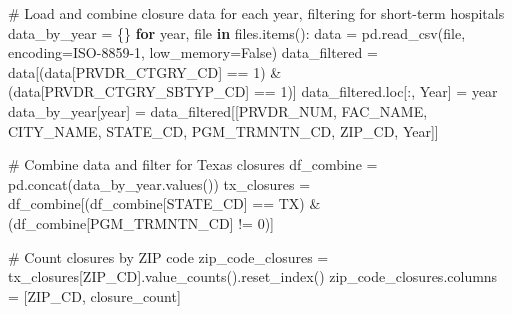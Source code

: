 \documentclass[
  letterpaper,
  DIV=11,
  numbers=noendperiod]{scrartcl}
\newenvironment{Shaded}{\begin{snugshade}}{\end{snugshade}}
\newcommand{\BuiltInTok}[1]{\textcolor[rgb]{0.00,0.23,0.31}{#1}}
\newcommand{\CommentTok}[1]{\textcolor[rgb]{0.37,0.37,0.37}{#1}}
\newcommand{\ControlFlowTok}[1]{\textcolor[rgb]{0.00,0.23,0.31}{\textbf{#1}}}
\newcommand{\DecValTok}[1]{\textcolor[rgb]{0.68,0.00,0.00}{#1}}
\newcommand{\KeywordTok}[1]{\textcolor[rgb]{0.00,0.23,0.31}{\textbf{#1}}}
\newcommand{\NormalTok}[1]{\textcolor[rgb]{0.00,0.23,0.31}{#1}}
\newcommand{\OperatorTok}[1]{\textcolor[rgb]{0.37,0.37,0.37}{#1}}
\newcommand{\StringTok}[1]{\textcolor[rgb]{0.13,0.47,0.30}{#1}}
\newcommand{\VariableTok}[1]{\textcolor[rgb]{0.07,0.07,0.07}{#1}}
\begin{document}
\begin{Shaded}
\begin{Highlighting}[]
\CommentTok{\# Load and combine closure data for each year, filtering for short{-}term hospitals}
\NormalTok{data\_by\_year }\OperatorTok{=}\NormalTok{ \{\}}
\ControlFlowTok{for}\NormalTok{ year, }\BuiltInTok{file} \KeywordTok{in}\NormalTok{ files.items():}
\NormalTok{    data }\OperatorTok{=}\NormalTok{ pd.read\_csv(}\BuiltInTok{file}\NormalTok{, encoding}\OperatorTok{=}\StringTok{\textquotesingle{}ISO{-}8859{-}1\textquotesingle{}}\NormalTok{, low\_memory}\OperatorTok{=}\VariableTok{False}\NormalTok{)}
\NormalTok{    data\_filtered }\OperatorTok{=}\NormalTok{ data[(data[}\StringTok{\textquotesingle{}PRVDR\_CTGRY\_CD\textquotesingle{}}\NormalTok{] }\OperatorTok{==} \DecValTok{1}\NormalTok{) }\OperatorTok{\&}\NormalTok{ (data[}\StringTok{\textquotesingle{}PRVDR\_CTGRY\_SBTYP\_CD\textquotesingle{}}\NormalTok{] }\OperatorTok{==} \DecValTok{1}\NormalTok{)]}
\NormalTok{    data\_filtered.loc[:, }\StringTok{\textquotesingle{}Year\textquotesingle{}}\NormalTok{] }\OperatorTok{=}\NormalTok{ year}
\NormalTok{    data\_by\_year[year] }\OperatorTok{=}\NormalTok{ data\_filtered[[}\StringTok{\textquotesingle{}PRVDR\_NUM\textquotesingle{}}\NormalTok{, }\StringTok{\textquotesingle{}FAC\_NAME\textquotesingle{}}\NormalTok{, }\StringTok{\textquotesingle{}CITY\_NAME\textquotesingle{}}\NormalTok{, }\StringTok{\textquotesingle{}STATE\_CD\textquotesingle{}}\NormalTok{, }\StringTok{\textquotesingle{}PGM\_TRMNTN\_CD\textquotesingle{}}\NormalTok{, }\StringTok{\textquotesingle{}ZIP\_CD\textquotesingle{}}\NormalTok{, }\StringTok{\textquotesingle{}Year\textquotesingle{}}\NormalTok{]]}

\CommentTok{\# Combine data and filter for Texas closures}
\NormalTok{df\_combine }\OperatorTok{=}\NormalTok{ pd.concat(data\_by\_year.values())}
\NormalTok{tx\_closures }\OperatorTok{=}\NormalTok{ df\_combine[(df\_combine[}\StringTok{\textquotesingle{}STATE\_CD\textquotesingle{}}\NormalTok{] }\OperatorTok{==} \StringTok{\textquotesingle{}TX\textquotesingle{}}\NormalTok{) }\OperatorTok{\&}\NormalTok{ (df\_combine[}\StringTok{\textquotesingle{}PGM\_TRMNTN\_CD\textquotesingle{}}\NormalTok{] }\OperatorTok{!=} \DecValTok{0}\NormalTok{)]}

\CommentTok{\# Count closures by ZIP code}
\NormalTok{zip\_code\_closures }\OperatorTok{=}\NormalTok{ tx\_closures[}\StringTok{\textquotesingle{}ZIP\_CD\textquotesingle{}}\NormalTok{].value\_counts().reset\_index()}
\NormalTok{zip\_code\_closures.columns }\OperatorTok{=}\NormalTok{ [}\StringTok{\textquotesingle{}ZIP\_CD\textquotesingle{}}\NormalTok{, }\StringTok{\textquotesingle{}closure\_count\textquotesingle{}}\NormalTok{]}


\end{Highlighting}
\end{Shaded}
\end{document}
